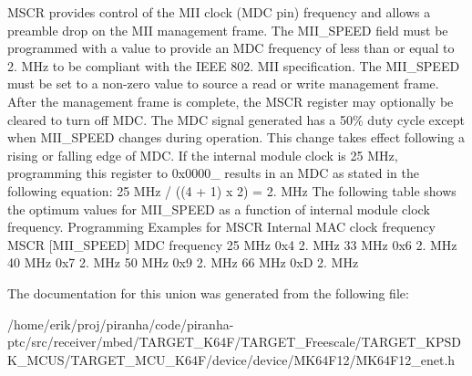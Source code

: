 M\+S\+CR provides control of the M\+II clock (M\+DC pin) frequency and allows a preamble drop on the M\+II management frame. The M\+I\+I\+\_\+\+S\+P\+E\+ED field must be programmed with a value to provide an M\+DC frequency of less than or equal to 2. M\+Hz to be compliant with the I\+E\+EE 802. M\+II specification. The M\+I\+I\+\_\+\+S\+P\+E\+ED must be set to a non-\/zero value to source a read or write management frame. After the management frame is complete, the M\+S\+CR register may optionally be cleared to turn off M\+DC. The M\+DC signal generated has a 50\% duty cycle except when M\+I\+I\+\_\+\+S\+P\+E\+ED changes during operation. This change takes effect following a rising or falling edge of M\+DC. If the internal module clock is 25 M\+Hz, programming this register to 0x0000\+\_ results in an M\+DC as stated in the following equation\+: 25 M\+Hz / ((4 + 1) x 2) = 2. M\+Hz The following table shows the optimum values for M\+I\+I\+\_\+\+S\+P\+E\+ED as a function of internal module clock frequency. Programming Examples for M\+S\+CR Internal M\+AC clock frequency M\+S\+CR \mbox{[}M\+I\+I\+\_\+\+S\+P\+E\+ED\mbox{]} M\+DC frequency 25 M\+Hz 0x4 2. M\+Hz 33 M\+Hz 0x6 2. M\+Hz 40 M\+Hz 0x7 2. M\+Hz 50 M\+Hz 0x9 2. M\+Hz 66 M\+Hz 0xD 2. M\+Hz 

The documentation for this union was generated from the following file\+:\begin{DoxyCompactItemize}
\item 
/home/erik/proj/piranha/code/piranha-\/ptc/src/receiver/mbed/\+T\+A\+R\+G\+E\+T\+\_\+\+K64\+F/\+T\+A\+R\+G\+E\+T\+\_\+\+Freescale/\+T\+A\+R\+G\+E\+T\+\_\+\+K\+P\+S\+D\+K\+\_\+\+M\+C\+U\+S/\+T\+A\+R\+G\+E\+T\+\_\+\+M\+C\+U\+\_\+\+K64\+F/device/device/\+M\+K64\+F12/M\+K64\+F12\+\_\+enet.\+h\end{DoxyCompactItemize}
